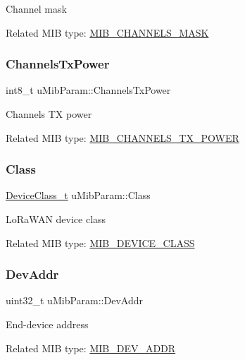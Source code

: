 Channel mask

Related M\+IB type\+: \hyperlink{group__LORAMAC_gga32ea83d13a3f5bb4b3ec2ace2319ab61aafe40b1c0e252d607876423247feab62}{M\+I\+B\+\_\+\+C\+H\+A\+N\+N\+E\+L\+S\+\_\+\+M\+A\+SK} \mbox{\label{unionuMibParam_a553f5873284511d95ebc5473a48b473a}} 
\subsubsection{\texorpdfstring{Channels\+Tx\+Power}{ChannelsTxPower}}
{\footnotesize\ttfamily int8\+\_\+t u\+Mib\+Param\+::\+Channels\+Tx\+Power}

Channels TX power

Related M\+IB type\+: \hyperlink{group__LORAMAC_gga32ea83d13a3f5bb4b3ec2ace2319ab61ae42f1a0c858ffdb283e0236a24ab6398}{M\+I\+B\+\_\+\+C\+H\+A\+N\+N\+E\+L\+S\+\_\+\+T\+X\+\_\+\+P\+O\+W\+ER} \mbox{\label{unionuMibParam_a0a7f108faca608d6271ed070b3666dad}} 
\subsubsection{\texorpdfstring{Class}{Class}}
{\footnotesize\ttfamily \hyperlink{group__LORAMAC_ga29dc2e097802faaf8fbd0e18ff99695f}{Device\+Class\+\_\+t} u\+Mib\+Param\+::\+Class}

Lo\+Ra\+W\+AN device class

Related M\+IB type\+: \hyperlink{group__LORAMAC_gga32ea83d13a3f5bb4b3ec2ace2319ab61ac0426517132356c9977dcdafa5ab3a7f}{M\+I\+B\+\_\+\+D\+E\+V\+I\+C\+E\+\_\+\+C\+L\+A\+SS} \mbox{\label{unionuMibParam_a41a1aedea4cb10b45ddf9b8ebd1fdf54}} 
\subsubsection{\texorpdfstring{Dev\+Addr}{DevAddr}}
{\footnotesize\ttfamily uint32\+\_\+t u\+Mib\+Param\+::\+Dev\+Addr}

End-\/device address

Related M\+IB type\+: \hyperlink{group__LORAMAC_gga32ea83d13a3f5bb4b3ec2ace2319ab61ab1459b05690ffa347a71393006b526ac}{M\+I\+B\+\_\+\+D\+E\+V\+\_\+\+A\+D\+DR} \mbox{\label{unionuMibParam_ab6a514e07df4b7d0b7df77362eb974d5}} 

